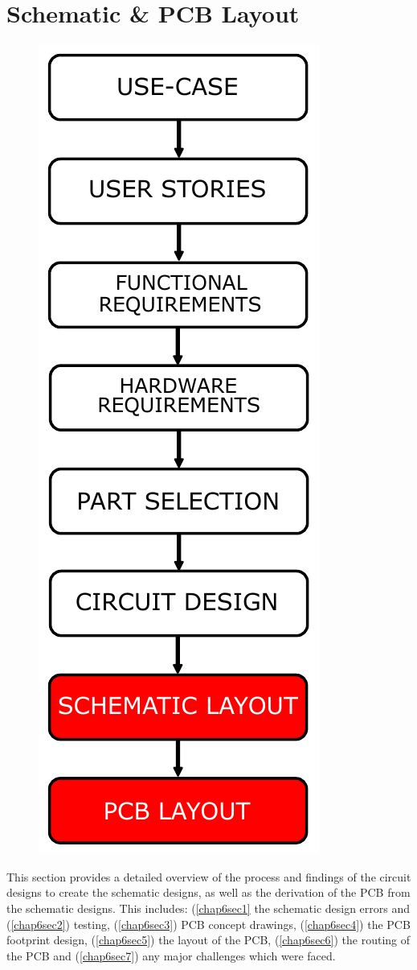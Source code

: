 
\chapter{Schematic \& PCB Layout} %

\label{Chapter6} %

\begin{figure}[!htb]
	\includegraphics[width=0.5\linewidth]{Figures/layout_table.pdf}\centering
	\label{fig:layout}
\end{figure}

	This section provides a detailed overview of the process and findings of the circuit designs to create the schematic designs, as well as the derivation of the PCB from the schematic designs. This includes: (\ref{chap6sec1} the schematic design errors and (\ref{chap6sec2}) testing, (\ref{chap6sec3}) PCB concept drawings, (\ref{chap6sec4}) the PCB footprint design, (\ref{chap6sec5}) the layout of the PCB, (\ref{chap6sec6}) the routing of the PCB and (\ref{chap6sec7}) any major challenges which were faced.\\

